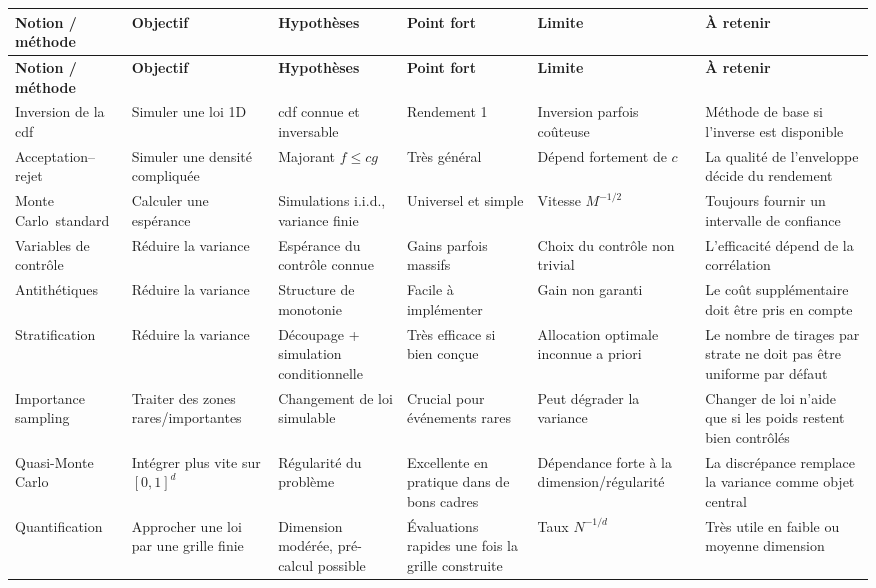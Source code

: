 \documentclass[11pt,a4paper]{article}
\newcommand{\mc}{Monte Carlo}
\newcommand{\qmc}{Quasi-Monte Carlo}
\begin{document}
\begingroup
\scriptsize
\setlength{\tabcolsep}{4pt}
\setlength{\LTleft}{0pt}
\setlength{\LTright}{0pt}
\begin{longtable}{@{}P{0.15\textwidth}P{0.13\textwidth}P{0.14\textwidth}P{0.13\textwidth}P{0.13\textwidth}P{0.18\textwidth}@{}}
\toprule
\textbf{Notion / méthode} & \textbf{Objectif} & \textbf{Hypothèses} & \textbf{Point fort} & \textbf{Limite} & \textbf{À retenir} \\
\midrule
\endfirsthead
\toprule
\textbf{Notion / méthode} & \textbf{Objectif} & \textbf{Hypothèses} & \textbf{Point fort} & \textbf{Limite} & \textbf{À retenir} \\
\midrule
\endhead
\bottomrule
\endfoot
Inversion de la cdf & Simuler une loi 1D & cdf connue et inversable & Rendement 1 & Inversion parfois coûteuse & Méthode de base si l'inverse est disponible \\
Acceptation--rejet & Simuler une densité compliquée & Majorant $f\le cg$ & Très général & Dépend fortement de $c$ & La qualité de l'enveloppe décide du rendement \\
\mc\ standard & Calculer une espérance & Simulations i.i.d., variance finie & Universel et simple & Vitesse $M^{-1/2}$ & Toujours fournir un intervalle de confiance \\
Variables de contrôle & Réduire la variance & Espérance du contrôle connue & Gains parfois massifs & Choix du contrôle non trivial & L'efficacité dépend de la corrélation \\
Antithétiques & Réduire la variance & Structure de monotonie & Facile à implémenter & Gain non garanti & Le coût supplémentaire doit être pris en compte \\
Stratification & Réduire la variance & Découpage + simulation conditionnelle & Très efficace si bien conçue & Allocation optimale inconnue a priori & Le nombre de tirages par strate ne doit pas être uniforme par défaut \\
Importance sampling & Traiter des zones rares/importantes & Changement de loi simulable & Crucial pour événements rares & Peut dégrader la variance & Changer de loi n'aide que si les poids restent bien contrôlés \\
\qmc & Intégrer plus vite sur $[0,1]^d$ & Régularité du problème & Excellente en pratique dans de bons cadres & Dépendance forte à la dimension/régularité & La discrépance remplace la variance comme objet central \\
Quantification & Approcher une loi par une grille finie & Dimension modérée, pré-calcul possible & Évaluations rapides une fois la grille construite & Taux $N^{-1/d}$ & Très utile en faible ou moyenne dimension \\

\end{longtable}
\end{document}
